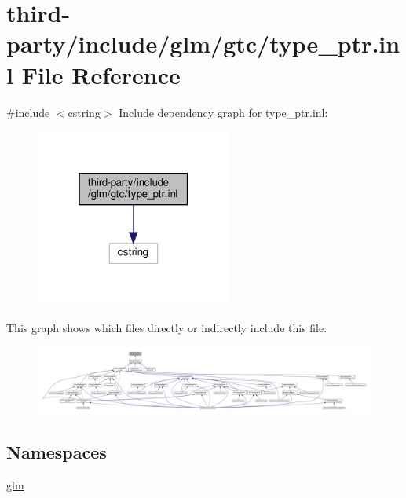 \hypertarget{type__ptr_8inl}{}\section{third-\/party/include/glm/gtc/type\+\_\+ptr.inl File Reference}
\label{type__ptr_8inl}
{\ttfamily \#include $<$cstring$>$}\newline
Include dependency graph for type\+\_\+ptr.\+inl\+:\nopagebreak
\begin{figure}[H]
\begin{center}
\leavevmode
\includegraphics[width=183pt]{type__ptr_8inl__incl}
\end{center}
\end{figure}
This graph shows which files directly or indirectly include this file\+:
\nopagebreak
\begin{figure}[H]
\begin{center}
\leavevmode
\includegraphics[width=350pt]{type__ptr_8inl__dep__incl}
\end{center}
\end{figure}
\subsection*{Namespaces}
\begin{DoxyCompactItemize}
\item 
 \hyperlink{namespaceglm}{glm}
\end{DoxyCompactItemize}
